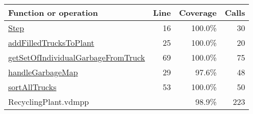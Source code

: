 \bigskip
\begin{longtable}{|l|r|r|r|}
\hline
Function or operation & Line & Coverage & Calls \\
\hline
\hline
\hyperref[Step:16]{Step} & 16&100.0\% & 30 \\
\hline
\hyperref[addFilledTrucksToPlant:25]{addFilledTrucksToPlant} & 25&100.0\% & 20 \\
\hline
\hyperref[getSetOfIndividualGarbageFromTruck:69]{getSetOfIndividualGarbageFromTruck} & 69&100.0\% & 75 \\
\hline
\hyperref[handleGarbageMap:29]{handleGarbageMap} & 29&97.6\% & 48 \\
\hline
\hyperref[sortAllTrucks:53]{sortAllTrucks} & 53&100.0\% & 50 \\
\hline
\hline
RecyclingPlant.vdmpp & & 98.9\% & 223 \\
\hline
\end{longtable}

